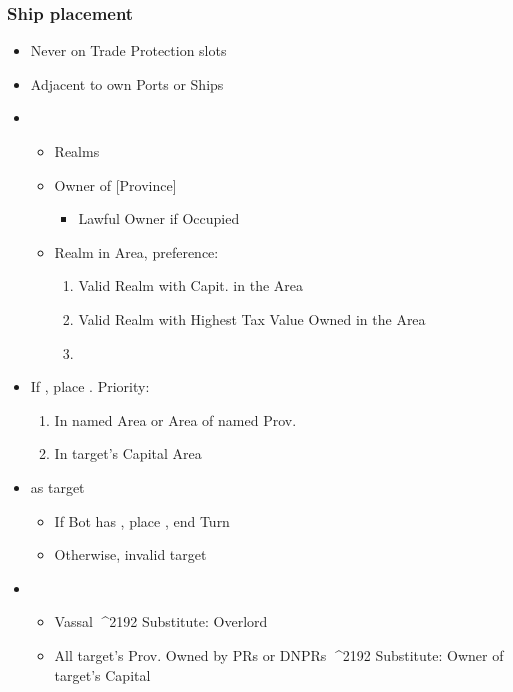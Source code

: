 \documentclass[10pt]{article}
\begin{document}
\subsubsection*{Ship placement}
\begin{itemize}
	\item Never on Trade Protection slots
	\item Adjacent to own Ports or Ships
\end{itemize}

\begin{itemize}
	\item {}
	\begin{itemize}
		\item Realms
		\item \dprime Owner of [Province]\dprime
		\begin{itemize}
			\item Lawful Owner if Occupied
		\end{itemize}
		\item \dprime Realm in Area\dprime, preference:
		\begin{enumerate}
			\item Valid Realm with Capit. in the Area
			\item Valid Realm with Highest Tax Value Owned in the Area
			\item \az
		\end{enumerate}
	\end{itemize}
	\item If , place \claim. Priority:
	\begin{enumerate}
		\item In named Area or Area of named Prov.
		\item In target's Capital Area
	\end{enumerate}
	\item {} as target
	\begin{itemize}
		\item If Bot has , place \claim, end Turn
		\item Otherwise, invalid target
	\end{itemize}
	\item {}
	\begin{itemize}
		\item Vassal ^^^^2192 Substitute: Overlord
		\item All target's Prov. Owned by PRs or DNPRs ^^^^2192 Substitute: Owner of target's Capital

\end{itemize}
\end{itemize}
\end{document}
